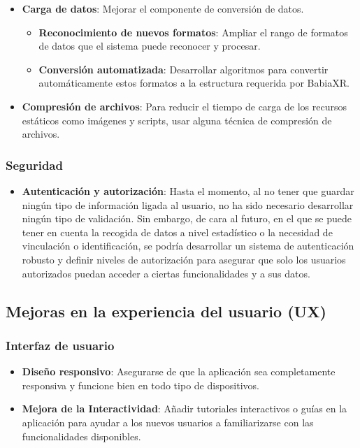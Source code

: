 \documentclass[a4paper, 12pt]{book}
\begin{document}
\begin{itemize}
    \item \textbf{Carga de datos}: Mejorar el componente de conversión de datos.
    \begin{itemize}
        \item \textbf{Reconocimiento de nuevos formatos}: Ampliar el rango de formatos de datos que el sistema puede reconocer y procesar.
        \item \textbf{Conversión automatizada}: Desarrollar algoritmos para convertir automáticamente estos formatos a la estructura requerida por BabiaXR.
    \end{itemize}   
    \item \textbf{Compresión de archivos}: Para reducir el tiempo de carga de los recursos estáticos como imágenes y scripts, usar alguna técnica de compresión de archivos.
\end{itemize}

\subsubsection{Seguridad}

\begin{itemize}
    \item \textbf{Autenticación y autorización}: Hasta el momento, al no tener que guardar ningún tipo de información ligada al usuario, no ha sido necesario desarrollar ningún tipo de validación. Sin embargo, de cara al futuro, en el que se puede tener en cuenta la recogida de datos a nivel estadístico o la necesidad de vinculación o identificación, se podría desarrollar un sistema de autenticación robusto y definir niveles de autorización para asegurar que solo los usuarios autorizados puedan acceder a ciertas funcionalidades y a sus datos.
\end{itemize}

\subsection{Mejoras en la experiencia del usuario (UX)}

\subsubsection{Interfaz de usuario}

\begin{itemize}
    \item \textbf{Diseño responsivo}: Asegurarse de que la aplicación sea completamente responsiva y funcione bien en todo tipo de dispositivos.
    \item \textbf{Mejora de la Interactividad}: Añadir tutoriales interactivos o guías en la aplicación para ayudar a los nuevos usuarios a familiarizarse con las funcionalidades disponibles.
\end{itemize}
\end{document}
